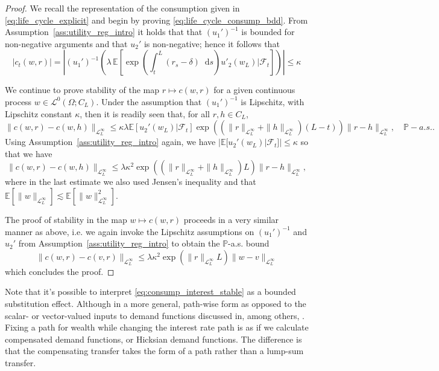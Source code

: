 \documentclass[11pt,oneside,english,reqno,dvipsnames,table]{amsart}
\numberwithin{equation}{section}
\theoremstyle{plain}
\theoremstyle{definition}
\theoremstyle{remark}
\theoremstyle{plain}
\theoremstyle{plain}
\theoremstyle{plain}
\theoremstyle{plain}
\theoremstyle{plain}
\theoremstyle{plain}
\theoremstyle{plain}
\newcommand{\cF}{\mathcal{F}}
\newcommand{\EE}{\mathbb{E}}
\newcommand{\PP}{\mathbb{P}}
\newcommand{\dd}{\mathop{}\!\mathrm{d}}
\newcommand{\mbP}{\mathbb{P}}
\newcommand{\msL}{\mathscr{L}}
\numberwithin{thm}{section}
\begin{document}
\begin{proof}
    We recall the representation of the consumption given in \eqref{eq:life_cycle_explicit} and begin by proving \eqref{eq:life_cycle_consump_bdd}. From Assumption~\ref{ass:utility_reg_intro} it holds that that $(u_1')^{-1}$ is bounded for non-negative arguments and that $u_2'$ is non-negative; hence it follows that 
    \begin{equation}\label{eq:bdd_consumption}
         | c_t(w,r)| = \left|(u_1')^{-1}\left(\lambda\, \EE\left[\exp\left(\int_t^L (r_s-\delta)\dd s\right) u'_2(w_L)|\cF_t\right]\right)\right| \leq \kappa
    \end{equation}
     
    
    We continue to prove stability of the map $r\mapsto c(w,r)$ for a given continuous process $w\in \msL^0(\Omega;C_L)$. 
    Under the assumption that $(u_1')^{-1}$ is Lipschitz, with Lipschitz constant $\kappa$, then it is readily seen that, for all $r,h\in C_L$,
    \[
     \|c(w,r)-c(w,h)\|_{\msL^\infty_L} \leq \kappa \lambda \EE[u_2'(w_L)|\cF_t]\exp((\|r\|_{\msL^\infty_L}+\|h\|_{\msL^\infty_L})(L-t))\| r-h \|_{\msL^\infty_L},\quad \PP-a.s..
    \]
Using Assumption~\ref{ass:utility_reg_intro} again, we have $|\EE[u_2'(w_L)|\cF_t]|\leq \kappa$ so that we have
%
 \[
     \|c(w,r)-c(w,h)\|_{\msL^\infty_L} \leq \lambda  \kappa^2 \exp((\|r\|_{\msL^\infty_L}+\|h\|_{\msL^\infty_L})L) \| r-h \|_{\msL^\infty_L}, 
    \]
%
    where in the last estimate we also used Jensen's inequality and that $\EE[\|w\|_{\msL^\infty_L}]\lesssim \EE[\|w\|_{\msL^\infty_L}^2]$. 

The proof of stability in the map $w\mapsto c(w,r)$ proceeds in a very similar manner as above, i.e. we again invoke the Lipschitz assumptions on $(u_1')^{-1}$ and $u_2'$ from Assumption~\ref{ass:utility_reg_intro} to obtain the $\mbP$-a.s. bound
%
\begin{equation*}
     \|c(w,r)-c(v,r)\|_{\msL^\infty_L} \leq \lambda \kappa^2 \exp(\|r\|_{\msL^\infty_L} L) \|w-v\|_{\msL^\infty_L}
\end{equation*}
%
    which concludes the proof. 
    \end{proof}

Note that it's possible to interpret \eqref{eq:consump_interest_stable} as a bounded substitution effect.
Although in a more general, path-wise form as opposed to the scalar- or vector-valued inputs to demand functions discussed in, among others, \cite{mas-colell.whinston.ea95}.
Fixing a path for wealth while changing the interest rate path is as if we calculate compensated demand functions, or Hicksian demand functions.
The difference is that the compensating transfer takes the form of a path rather than a lump-sum transfer.
\end{document}
